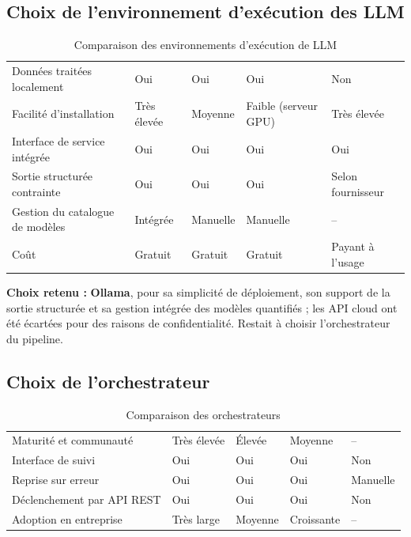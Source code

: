 \subsection{Choix de l'environnement d'exécution des LLM}

\begin{table}[H]
\centering
\small
\begin{tabular}{|L{3.6cm}|L{2.5cm}|L{2.5cm}|L{2.5cm}|L{2.6cm}|}
\hline
{} &  &  &  &  \\ \hline
Données traitées localement & Oui & Oui & Oui & Non \\ \hline
Facilité d'installation & Très élevée & Moyenne & Faible (serveur GPU) & Très élevée \\ \hline
Interface de service intégrée & Oui & Oui & Oui & Oui \\ \hline
Sortie structurée contrainte & Oui & Oui & Oui & Selon fournisseur \\ \hline
Gestion du catalogue de modèles & Intégrée & Manuelle & Manuelle & -- \\ \hline
Coût & Gratuit & Gratuit & Gratuit & Payant à l'usage \\ \hline
\end{tabular}
\caption{Comparaison des environnements d'exécution de LLM}
\label{tab:cmp-runtime}
\end{table}

\noindent\textbf{Choix retenu :} \textbf{Ollama}, pour sa simplicité de déploiement, son support de la sortie structurée et sa gestion intégrée des modèles quantifiés ; les API cloud ont été écartées pour des raisons de confidentialité. Restait à choisir l'orchestrateur du pipeline.

\subsection{Choix de l'orchestrateur}

\begin{table}[H]
\centering
\small
\begin{tabular}{|L{3.8cm}|L{2.5cm}|L{2.5cm}|L{2.5cm}|L{2.4cm}|}
\hline
{} &  &  &  &  \\ \hline
Maturité et communauté & Très élevée & Élevée & Moyenne & -- \\ \hline
Interface de suivi & Oui & Oui & Oui & Non \\ \hline
Reprise sur erreur & Oui & Oui & Oui & Manuelle \\ \hline
Déclenchement par API REST & Oui & Oui & Oui & Non \\ \hline
Adoption en entreprise & Très large & Moyenne & Croissante & -- \\ \hline
\end{tabular}
\caption{Comparaison des orchestrateurs}
\label{tab:cmp-orch}
\end{table}

